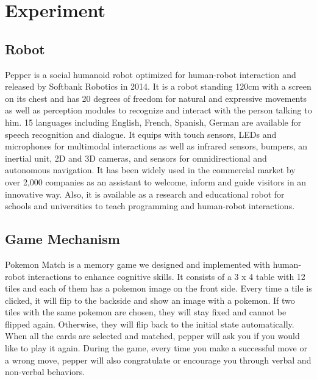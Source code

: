 \documentclass[12pt]{article}
\begin{document}
\section{Experiment}

\subsection{Robot}
Pepper is a social humanoid robot optimized for human-robot interaction and released by Softbank Robotics in 2014. It is a robot standing 120cm with a screen on its chest and has 20 degrees of freedom for natural and expressive movements as well as perception modules to recognize and interact with the person talking to him. 15 languages including English, French, Spanish, German are available  for speech recognition and dialogue. It equips with touch sensors, LEDs and microphones for multimodal interactions as well as infrared sensors, bumpers, an inertial unit, 2D and 3D cameras, and sensors for omnidirectional and autonomous navigation. It has been widely used in the commercial market by over 2,000 companies as an assistant to welcome, inform and guide visitors in an innovative way. Also, it is available as a research and educational robot for schools and universities to teach programming and human-robot interactions. 

\subsection{Game Mechanism}
Pokemon Match is a memory game we designed and implemented with human-robot interactions to enhance cognitive skills. It consists of a 3 x 4 table with 12 tiles and each of them has a pokemon image on the front side. Every time a tile is clicked, it will flip to the backside and show an image with a pokemon. If two tiles with the same pokemon are chosen, they will stay fixed and cannot be flipped again. Otherwise, they will flip back to the initial state automatically. When all the cards are selected and matched, pepper will ask you if you would like to play it again. During the game, every time you make a successful move or a wrong move, pepper will also congratulate or encourage you through verbal and non-verbal behaviors.
\end{document}
